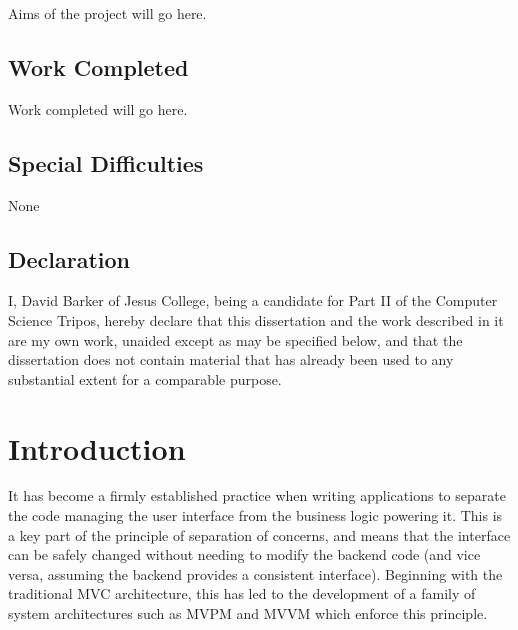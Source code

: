\documentclass[12pt,twoside,notitlepage]{report}
\begin{document}
Aims of the project will go here.


\section*{Work Completed}

Work completed will go here.

\section*{Special Difficulties}

None
 
\newpage
\section*{Declaration}

I, David Barker of Jesus College, being a candidate for Part II of
the Computer Science Tripos, hereby declare that this dissertation
and the work described in it are my own work, unaided except as may
be specified below, and that the dissertation does not contain
material that has already been used to any substantial extent for a
comparable purpose.

\bigskip
{}

\medskip
{}

\cleardoublepage

\tableofcontents

\listoffigures

\newpage



\cleardoublepage

\setcounter{page}{1}
\pagestyle{headings}



\chapter{Introduction}

It has become a firmly established practice when writing applications to separate the code managing the user interface from the business logic powering it. This is a key part of the principle of separation of concerns, and means that the interface can be safely changed without needing to modify the backend code (and vice versa, assuming the backend provides a consistent interface). Beginning with the traditional MVC architecture, this has led to the development of a family of system architectures such as MVPM and MVVM which enforce this principle.
\end{document}
